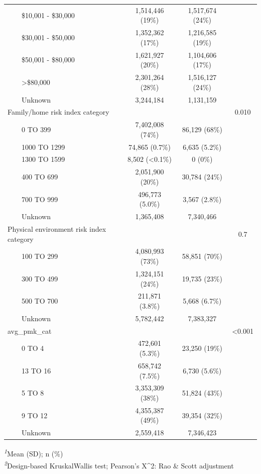 \documentclass[
]{article}
\begin{document}
\begin{table}[t]
\begin{tabular*}{\linewidth}{@{\extracolsep{\fill}}lccc}
    \$10,001 - \$30,000 & 1,514,446 (19\%) & 1,517,674 (24\%) &  \\ 
    \$30,001 - \$50,000 & 1,352,362 (17\%) & 1,216,585 (19\%) &  \\ 
    \$50,001 - \$80,000 & 1,621,927 (20\%) & 1,104,606 (17\%) &  \\ 
    >\$80,000 & 2,301,264 (28\%) & 1,516,127 (24\%) &  \\ 
    Unknown & 3,244,184 & 1,131,159 &  \\ 
Family/home risk index category &  &  & 0.010 \\ 
    0 TO 399 & 7,402,008 (74\%) & 86,129 (68\%) &  \\ 
    1000 TO 1299 & 74,865 (0.7\%) & 6,635 (5.2\%) &  \\ 
    1300 TO 1599 & 8,502 (<0.1\%) & 0 (0\%) &  \\ 
    400 TO 699 & 2,051,900 (20\%) & 30,784 (24\%) &  \\ 
    700 TO 999 & 496,773 (5.0\%) & 3,567 (2.8\%) &  \\ 
    Unknown & 1,365,408 & 7,340,466 &  \\ 
Physical environment risk index category &  &  & 0.7 \\ 
    100 TO 299 & 4,080,993 (73\%) & 58,851 (70\%) &  \\ 
    300 TO 499 & 1,324,151 (24\%) & 19,735 (23\%) &  \\ 
    500 TO 700 & 211,871 (3.8\%) & 5,668 (6.7\%) &  \\ 
    Unknown & 5,782,442 & 7,383,327 &  \\ 
avg\_pmk\_cat &  &  & <0.001 \\ 
    0 TO 4 & 472,601 (5.3\%) & 23,250 (19\%) &  \\ 
    13 TO 16 & 658,742 (7.5\%) & 6,730 (5.6\%) &  \\ 
    5 TO 8 & 3,353,309 (38\%) & 51,824 (43\%) &  \\ 
    9 TO 12 & 4,355,387 (49\%) & 39,354 (32\%) &  \\ 
    Unknown & 2,559,418 & 7,346,423 &  \\ 
\bottomrule
\end{tabular*}
\begin{minipage}{\linewidth}
\textsuperscript{\textit{1}}Mean (SD); n (\%)\\
\textsuperscript{\textit{2}}Design-based KruskalWallis test; Pearson's X\^{}2: Rao \& Scott adjustment\\
\end{minipage}
\end{table}
\end{document}
